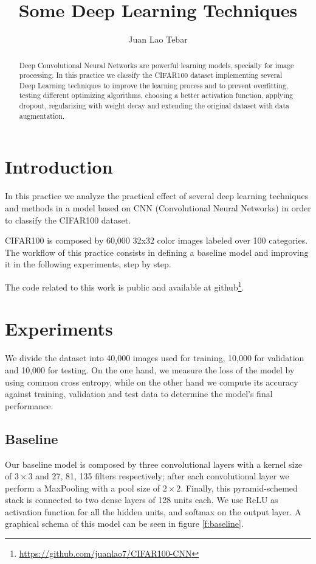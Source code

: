 \documentclass[]{article}
\title{Some Deep Learning Techniques}
\author{Juan Lao Tebar}
\begin{document}
\maketitle

\begin{abstract}

Deep Convolutional Neural Networks are powerful learning models, specially for image processing. In this practice we classify the CIFAR100 dataset implementing several Deep Learning techniques to improve the learning process and to prevent overfitting, testing different optimizing algorithms, choosing a better activation function, applying dropout, regularizing with weight decay and extending the original dataset with data augmentation.

\end{abstract}

\section{Introduction}

In this practice we analyze the practical effect of several deep learning techniques and methods in a model based on CNN (Convolutional Neural Networks) in order to classify the CIFAR100 dataset.

CIFAR100 is composed by 60,000 32x32 color images labeled over 100 categories. The workflow of this practice consists in defining a baseline model and improving it in the following experiments, step by step.

The code related to this work is public and available at github\footnote{\url{https://github.com/juanlao7/CIFAR100-CNN}}.

\section{Experiments}

We divide the dataset into 40,000 images used for training, 10,000 for validation and 10,000 for testing. On the one hand, we measure the loss of the model by using common cross entropy, while on the other hand we compute its accuracy against training, validation and test data to determine the model's final performance.

\subsection{Baseline}

Our baseline model is composed by three convolutional layers with a kernel size of $3\times3$ and 27, 81, 135 filters respectively; after each convolutional layer we perform a MaxPooling with a pool size of $2\times2$. Finally, this pyramid-schemed stack is connected to two dense layers of 128 units each. We use ReLU as activation function for all the hidden units, and softmax on the output layer. A graphical schema of this model can be seen in figure \ref{f:baseline}.
\end{document}
